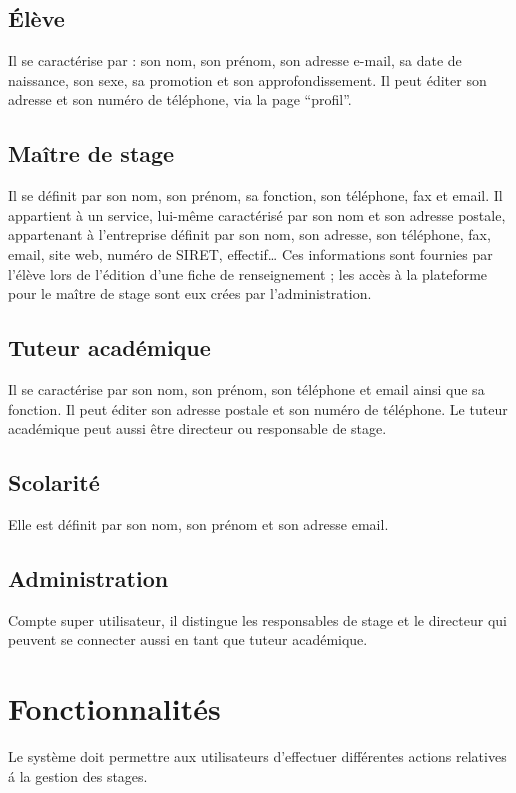 \documentclass{scrreprt}
\begin{document}
\subsection{\'El\`eve}
Il se caract\'erise par : son nom, son pr\'enom, son adresse e-mail, sa date de naissance, son sexe, sa promotion et son approfondissement. Il peut \'editer son adresse et son num\'ero de t\'el\'ephone, via la page “profil”.

\subsection{Ma\^itre de stage}
Il se d\'efinit par son nom, son pr\'enom, sa fonction, son t\'el\'ephone, fax et email. Il appartient \`a un service, lui-m\^eme caract\'eris\'e par son nom et son adresse postale, appartenant à l’entreprise définit par son nom, son adresse, son t\'el\'ephone, fax, email, site web,  num\'ero de SIRET, effectif… Ces informations sont fournies par l’\'el\`eve lors de l’\'edition d’une fiche de renseignement ; les acc\`es \`a la plateforme pour le ma\^itre de stage sont eux cr\'ees par l’administration.

\subsection{Tuteur acad\'emique}
Il se caract\'erise par son nom, son pr\'enom, son t\'el\'ephone et email ainsi que sa fonction. Il peut \'editer son adresse postale et son num\'ero de t\'el\'ephone.
Le tuteur acad\'emique peut aussi \^etre directeur ou responsable de stage.

\newpage
\subsection{Scolarit\'e}
Elle est d\'efinit par son nom, son pr\'enom et son adresse email.

\subsection{Administration}
Compte super utilisateur, il distingue les responsables de stage et le directeur qui peuvent se connecter aussi en tant que tuteur acad\'emique.

\section{Fonctionnalit\'es}
Le syst\`eme doit permettre aux utilisateurs d’effectuer diff\'erentes actions relatives \'a la gestion des stages.
\end{document}
